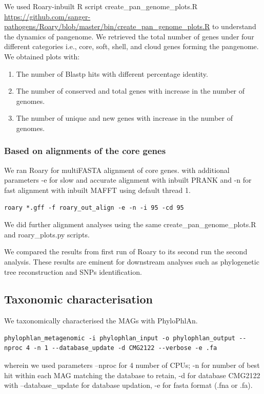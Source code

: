 \documentclass[11pt]{article}
\begin{document}
We used Roary-inbuilt R script create\_pan\_genome\_plots.R \url{https://github.com/sanger-pathogens/Roary/blob/master/bin/create_pan_genome_plots.R} to understand the dynamics of pangenome. We retrieved the total number of genes under four different categories i.e., core, soft, shell, and cloud genes forming the pangenome.
\newline
We obtained plots with:
\begin{enumerate}
\item The number of Blastp hits with different percentage identity.
\item The number of conserved and total genes with increase in the number of genomes.
\item The number of unique and new genes with increase in the number of genomes.
\end{enumerate}

\subsubsection{Based on alignments of the core genes}
We ran Roary for multiFASTA alignment of core genes\cite{Page2015}. with additional parameters -e for slow and accurate alignment with inbuilt PRANK and -n for fast alignment with inbuilt MAFFT using default thread 1.
\begin{lstlisting}
roary *.gff -f roary_out_align -e -n -i 95 -cd 95
\end{lstlisting}

We did further alignment analyses using the same create\_pan\_genome\_plots.R and roary\_plots.py scripts.

We compared the results from first run of Roary to its second run  the second analysis. These results are eminent for downstream analyses such as phylogenetic tree reconstruction and SNPs identification\cite{Farrah2019}.

\subsection{Taxonomic characterisation}
We taxonomically characterised the MAGs with PhyloPhlAn\cite{Asnicar2020}.

\begin{lstlisting}
phylophlan_metagenomic -i phylophlan_input -o phylophlan_output --nproc 4 -n 1 --database_update -d CMG2122 --verbose -e .fa 
\end{lstlisting}
wherein we used parameters --nproc for 4 number of CPUs; -n for number of best hit within each MAG matching the database to retain, -d for database CMG2122 with --database\_update for database updation, -e for fasta format (.fna or .fa). \\
\end{document}
